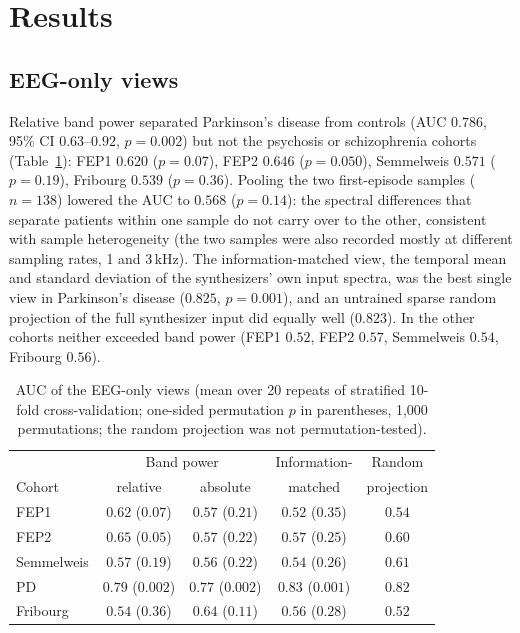 \documentclass[pdflatex,referee,sn-basic]{sn-jnl}%
\begin{document}
\section{Results}\label{section:results}

\subsection{EEG-only views}\label{section:res_eeg}

Relative band power separated Parkinson's disease from controls (AUC $0.786$, 95\% CI $0.63$--$0.92$, $p=0.002$) but not the psychosis or schizophrenia cohorts (Table~\ref{tab:eeg}): FEP1 $0.620$ ($p=0.07$), FEP2 $0.646$ ($p=0.050$), Semmelweis $0.571$ ($p=0.19$), Fribourg $0.539$ ($p=0.36$). Pooling the two first-episode samples ($n=138$) lowered the AUC to $0.568$ ($p=0.14$): the spectral differences that separate patients within one sample do not carry over to the other, consistent with sample heterogeneity (the two samples were also recorded mostly at different sampling rates, 1 and 3\,kHz). The information-matched view, the temporal mean and standard deviation of the synthesizers' own input spectra, was the best single view in Parkinson's disease ($0.825$, $p=0.001$), and an untrained sparse random projection of the full synthesizer input did equally well ($0.823$). In the other cohorts neither exceeded band power (FEP1 $0.52$, FEP2 $0.57$, Semmelweis $0.54$, Fribourg $0.56$).

\begin{table}[!htbp]
    \centering
    \caption{AUC of the EEG-only views (mean over 20 repeats of stratified 10-fold cross-validation; one-sided permutation $p$ in parentheses, 1,000 permutations; the random projection was not permutation-tested).}
    \label{tab:eeg}
    \footnotesize\setlength{\tabcolsep}{4pt}
    \begin{tabular}{@{}l c c c c@{}}
        \hline
        & \multicolumn{2}{c}{Band power} & Information- & Random \\
        Cohort & relative & absolute & matched & projection \\
        \hline
        FEP1 & $0.62$ ($0.07$) & $0.57$ ($0.21$) & $0.52$ ($0.35$) & $0.54$ \\
        FEP2 & $0.65$ ($0.05$) & $0.57$ ($0.22$) & $0.57$ ($0.25$) & $0.60$ \\
        Semmelweis & $0.57$ ($0.19$) & $0.56$ ($0.22$) & $0.54$ ($0.26$) & $0.61$ \\
        PD & $0.79$ ($0.002$) & $0.77$ ($0.002$) & $0.83$ ($0.001$) & $0.82$ \\
        Fribourg & $0.54$ ($0.36$) & $0.64$ ($0.11$) & $0.56$ ($0.28$) & $0.52$ \\
        \hline
    \end{tabular}
\end{table}
\end{document}
